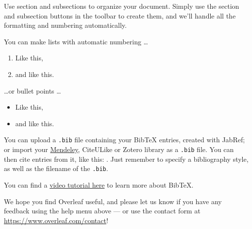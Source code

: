 \documentclass[a4paper]{article}
\begin{document}
Use section and subsections to organize your document. Simply use the section and subsection buttons in the toolbar to create them, and we'll handle all the formatting and numbering automatically.

You can make lists with automatic numbering \dots

\begin{enumerate}
\item Like this,
\item and like this.
\end{enumerate}
\dots or bullet points \dots
\begin{itemize}
\item Like this,
\item and like this.
\end{itemize}

You can upload a \verb|.bib| file containing your BibTeX entries, created with JabRef; or import your \href{https://www.overleaf.com/blog/184}{Mendeley}, CiteULike or Zotero library as a \verb|.bib| file. You can then cite entries from it, like this: \cite{greenwade93}. Just remember to specify a bibliography style, as well as the filename of the \verb|.bib|.

You can find a \href{https://www.overleaf.com/help/97-how-to-include-a-bibliography-using-bibtex}{video tutorial here} to learn more about BibTeX.

We hope you find Overleaf useful, and please let us know if you have any feedback using the help menu above --- or use the contact form at \url{https://www.overleaf.com/contact}!



\end{document}
